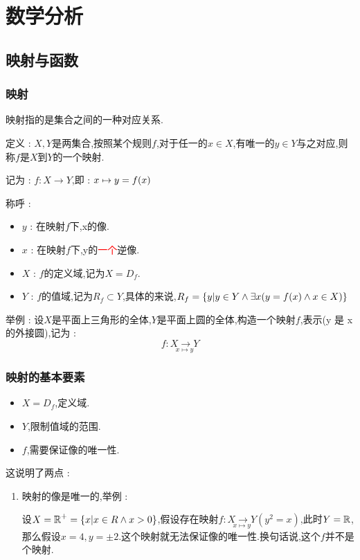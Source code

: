 \section{数学分析}{
\subsection{映射与函数}{

\subsubsection{映射}{
    映射指的是集合之间的一种对应关系.

    定义 : $X,Y$是两集合,按照某个规则$f$,对于任一的$x \in X$,有唯一的$y \in Y$与之对应,则称$f$是$X$到$Y$的一个映射.

    记为 : $f: X \to Y$,即 : $x \mapsto y = f(x)$

    称呼 :

    \begin{itemize}
        \item $y$ : 在映射$f$下,x的像.
        \item $x$ : 在映射$f$下,y的\textcolor{red}{一个}逆像.
        \item $X$ : $f$的定义域,记为$X = D_f$.
        \item $Y$ : $f$的值域,记为$R_f \subset Y$,具体的来说,$R_f = \left\{ y | y \in Y \land \exists x(y = f(x) \land x \in X) \right\}$
    \end{itemize}

    举例 : 设$X$是平面上三角形的全体,$Y$是平面上圆的全体,构造一个映射$f$,表示(y 是 x 的外接圆),记为 : $$
        f : \underset{x \mapsto y}{X \to Y}
    $$
}%

\subsubsection{映射的基本要素}{
    \begin{itemize}
        \item $X = D_f$,定义域.
        \item $Y$,限制值域的范围.
        \item $f$,需要保证像的唯一性.
    \end{itemize}

    这说明了两点 : \begin{enumerate}
        \item {
              映射的像是唯一的,举例 :

              设$X = \operatorname{\mathbb{R}}^+ = \left\{ x | x \in R \land x > 0 \right\}$,假设存在映射$f : \underset{x \mapsto y}{X \to Y}(y^2 = x)$,此时$Y = \operatorname{\mathbb{R}}$,那么假设$x = 4,y = \pm 2$.这个映射就无法保证像的唯一性.换句话说,这个$f$并不是个映射.

}
\end{enumerate}}}}
